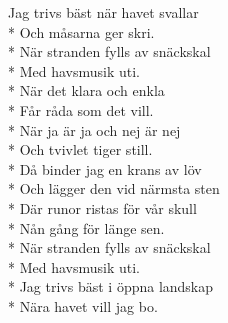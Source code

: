 \begin{SongText}
    \begin{SongVerse}
        Jag trivs bäst när havet svallar\\*%
        Och måsarna ger skri.\\*%
        När stranden fylls av snäckskal\\*%
        Med havsmusik uti.\\*%
        När det klara och enkla\\*%
        Får råda som det vill.\\*%
        När ja är ja och nej är nej\\*%
        Och tvivlet tiger still.\\*%
        Då binder jag en krans av löv\\*%
        Och lägger den vid närmsta sten\\*%
        Där runor ristas för vår skull\\*%
        Nån gång för länge sen.\\*%
        När stranden fylls av snäckskal\\*%
        Med havsmusik uti.\\*%
        Jag trivs bäst i öppna landskap\\*%
        Nära havet vill jag bo. 
    \end{SongVerse}
\end{SongText}